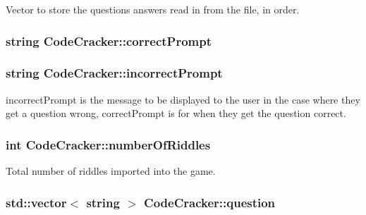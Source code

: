 Vector to store the questions answers read in from the file, in order. 

\hypertarget{classCodeCracker_a04985dac2f5fe286fa82679217cfe506}{
\subsubsection[{correct\-Prompt}]{\setlength{\rightskip}{0pt plus 5cm}string Code\-Cracker\-::correct\-Prompt\hspace{0.3cm}{\ttfamily [private]}}}\label{classCodeCracker_a04985dac2f5fe286fa82679217cfe506}
\hypertarget{classCodeCracker_a89ef12be75881a80ed411daf64bb425c}{
\subsubsection[{incorrect\-Prompt}]{\setlength{\rightskip}{0pt plus 5cm}string Code\-Cracker\-::incorrect\-Prompt\hspace{0.3cm}{\ttfamily [private]}}}\label{classCodeCracker_a89ef12be75881a80ed411daf64bb425c}
incorrect\-Prompt is the message to be displayed to the user in the case where they get a question wrong, correct\-Prompt is for when they get the question correct. \hypertarget{classCodeCracker_a30671a1b282dc98361938283fbafcf6e}{
\subsubsection[{number\-Of\-Riddles}]{\setlength{\rightskip}{0pt plus 5cm}int Code\-Cracker\-::number\-Of\-Riddles\hspace{0.3cm}{\ttfamily [private]}}}\label{classCodeCracker_a30671a1b282dc98361938283fbafcf6e}


Total number of riddles imported into the game. 

\hypertarget{classCodeCracker_a63753bcf7954495c7964715758e0fea9}{
\subsubsection[{question}]{\setlength{\rightskip}{0pt plus 5cm}std\-::vector$<$ string $>$ Code\-Cracker\-::question\hspace{0.3cm}{\ttfamily [private]}}}\label{classCodeCracker_a63753bcf7954495c7964715758e0fea9}


